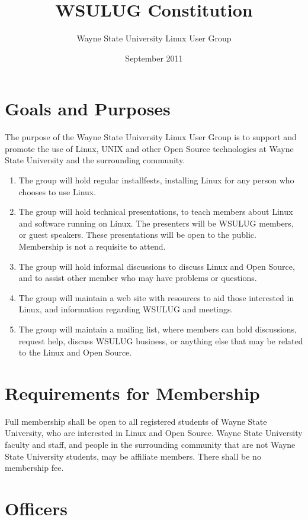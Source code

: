 \documentclass{article}
\begin{document}
\title{WSULUG Constitution}
\author{Wayne State University Linux User Group}
\date{September 2011}
\maketitle

\section{Goals and Purposes}
The purpose of the Wayne State University Linux User Group is to support and promote the use of Linux, UNIX and other Open Source technologies at Wayne State University and the surrounding community.

\begin{enumerate}
\item The group will hold regular installfests, installing Linux for any person who chooses to use Linux.
\item The group will hold technical presentations, to teach members about Linux and software running on Linux.  The presenters will be WSULUG members, or guest speakers.  These presentations will be open to the public. Membership is not a requisite to attend.
\item The group will hold informal discussions to discuss Linux and Open Source, and to assist other member who may have problems or questions.
\item The group will maintain a web site with resources to aid those interested in Linux, and information regarding WSULUG and meetings.
\item The group will maintain a mailing list, where members can hold discussions, request help, discuss WSULUG business, or anything else that may be related to the Linux and Open Source.
\end{enumerate}

\section{Requirements for Membership}
Full membership shall be open to all registered students of Wayne State University, who are interested in Linux and Open Source.  Wayne State University faculty and staff, and people in the surrounding community that are not Wayne State University students, may be affiliate members. There shall be no membership fee.

\section{Officers}
\end{document}
